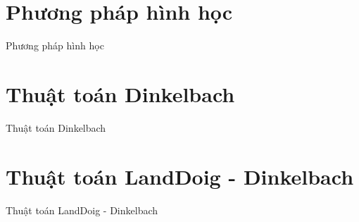 \documentclass{beamer}
\begin{document}
\section{Phương pháp hình học}

\begin{frame}
   \center 
   \huge Phương pháp hình học 
\end{frame}

\section{Thuật toán Dinkelbach}

\begin{frame}
   \center 
   \huge Thuật toán Dinkelbach
\end{frame}

\section{Thuật toán LandDoig - Dinkelbach}

\begin{frame}
   \center 
   \huge Thuật toán LandDoig - Dinkelbach
\end{frame}

\begin{frame}
\end{frame}
\end{document}
